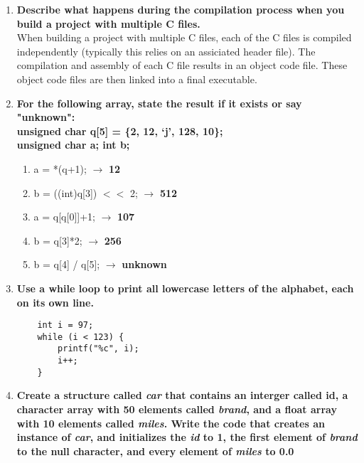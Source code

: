\documentclass{article}
\begin{document}
\begin{enumerate}[label=\textbf{\arabic*})]
    \item \textbf{Describe what happens during the compilation process when you 
    build a project with multiple C files.} \\

    When building a project with multiple C files, each of the C files is compiled independently
    (typically this relies on an assiciated header file). The compilation and assembly of each C 
    file results in an object code file. These object code files are then linked into a final 
    executable. 

    \item \textbf{For the following array, state the result if it exists or say "unknown": \\
    unsigned char q[5] = \{2, 12, `j', 128, 10\}; \\
    unsigned char a; int b;} \\

    \begin{enumerate}[label=\textbf{\alph*}.]
        \item a = *(q+1); $\rightarrow$ \textbf{12}
        \item b = ((int)q[3]) $<<$ 2; $\rightarrow$ \textbf{512}
        \item a = q[q[0]]+1; $\rightarrow$ \textbf{107}
        \item b = q[3]*2; $\rightarrow$ \textbf{256}
        \item b = q[4] / q[5]; $\rightarrow$ \textbf{unknown}
    \end{enumerate}

    \pagebreak
    \item \textbf{Use a while loop to print all lowercase letters of the alphabet, each on its own line.} \\
    
    \begin{lstlisting}
    int i = 97;
    while (i < 123) {
        printf("%c", i);
        i++;
    }
    \end{lstlisting}

    \item \textbf{Create a structure called \textit{car} that contains an interger called id, a character array
    with 50 elements called \textit{brand}, and a float array with 10 elements called \textit{miles}.
    Write the code that creates an instance of \textit{car}, and initializes the \textit{id} to 1, the first
    element of \textit{brand} to the null character, and every element of \textit{miles} to 0.0} \\


\end{enumerate}
\end{document}

